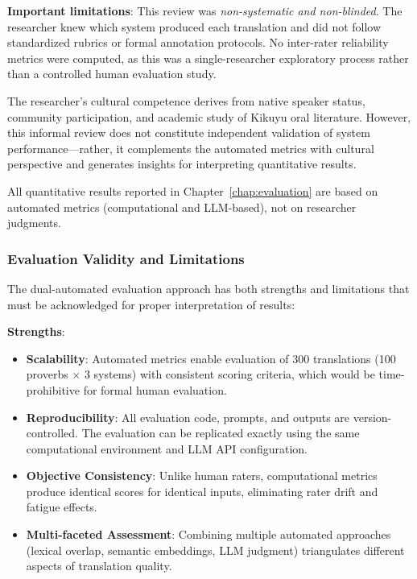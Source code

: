 \textbf{Important limitations}: This review was \emph{non-systematic and non-blinded}. The researcher knew which system produced each translation and did not follow standardized rubrics or formal annotation protocols. No inter-rater reliability metrics were computed, as this was a single-researcher exploratory process rather than a controlled human evaluation study.

The researcher's cultural competence derives from native speaker status, community participation, and academic study of Kikuyu oral literature. However, this informal review does not constitute independent validation of system performance—rather, it complements the automated metrics with cultural perspective and generates insights for interpreting quantitative results.

All quantitative results reported in Chapter~\ref{chap:evaluation} are based on automated metrics (computational and LLM-based), not on researcher judgments.

\subsubsection{Evaluation Validity and Limitations}
\label{subsubsec:eval_validity}

The dual-automated evaluation approach has both strengths and limitations that must be acknowledged for proper interpretation of results:

\textbf{Strengths}:
\begin{itemize}
    \item \textbf{Scalability}: Automated metrics enable evaluation of 300 translations (100 proverbs × 3 systems) with consistent scoring criteria, which would be time-prohibitive for formal human evaluation.
    
    \item \textbf{Reproducibility}: All evaluation code, prompts, and outputs are version-controlled. The evaluation can be replicated exactly using the same computational environment and LLM API configuration.
    
    \item \textbf{Objective Consistency}: Unlike human raters, computational metrics produce identical scores for identical inputs, eliminating rater drift and fatigue effects.
    
    \item \textbf{Multi-faceted Assessment}: Combining multiple automated approaches (lexical overlap, semantic embeddings, LLM judgment) triangulates different aspects of translation quality.
\end{itemize}


